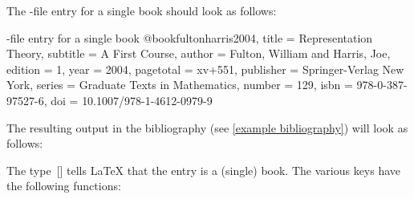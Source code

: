 The -file entry for a single book should look as follows: 
\begin{showcode}[label = {bib entry single book}]{-file entry for a single book}
@book{fultonharris2004,
  title     = {Representation Theory},
  subtitle  = {A First Course},
  author    = {Fulton, William and Harris, Joe},
  edition   = {1},
  year      = {2004},
  pagetotal = {xv+551},
  publisher = {Springer-Verlag New York},
  series    = {Graduate Texts in Mathematics},
  number    = {129},
  isbn      = {978-0-387-97527-6},
  doi       = {10.1007/978-1-4612-0979-9}
}
\end{showcode}
The resulting output in the bibliography (see \cref{example bibliography}) will look as follows:

The type~[\atname] tells {\LaTeX} that the entry is a (single) book.
The various keys have the following functions:
